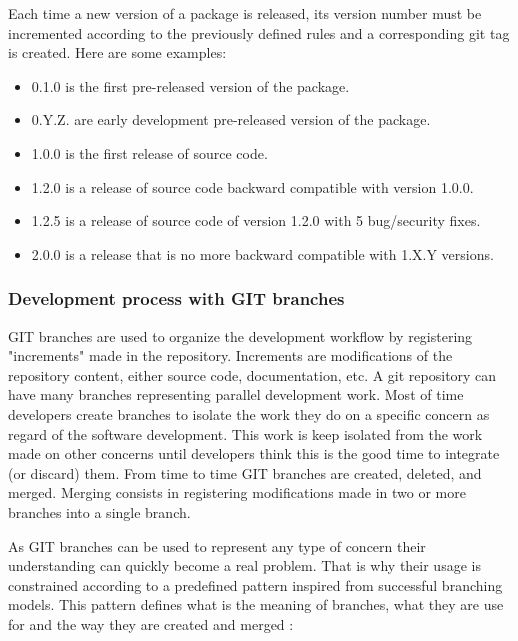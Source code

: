 \documentclass[12pt,a4paper]{article}
\begin{document}
Each time a new version of a package is released, its version number must be incremented according to the previously defined rules and a corresponding git tag is created. Here are some examples:
\begin{itemize}
\item 0.1.0 is the first pre-released version of the package.
\item 0.Y.Z. are early development pre-released version of the package.
\item 1.0.0 is the first release of source code.
\item 1.2.0  is a release of source code backward compatible with version 1.0.0.
\item 1.2.5 is a release of source code of version 1.2.0 with 5 bug/security fixes.
\item 2.0.0 is a release that is no more backward compatible with 1.X.Y versions.
\end{itemize}

\subsubsection{Development process with GIT branches}

GIT branches are used to organize the development workflow by registering "increments" made in the repository. Increments are modifications of the repository content, either source code, documentation, etc. A git repository can have many branches representing parallel development work. Most of time developers create branches to isolate the work they do on a specific concern as regard of the software development. This work is keep isolated from the work made on other concerns until developers think this is the good time to integrate (or discard) them. From time to time GIT branches are created, deleted, and merged. Merging consists in registering modifications made in two or more branches into a single branch.

As GIT branches can be used to represent any type of concern their understanding can quickly become a real problem. That is why their usage is constrained according to a predefined pattern inspired from successful branching models. This pattern defines what is the meaning of branches, what they are use for and the way they are created and merged :
\end{document}
